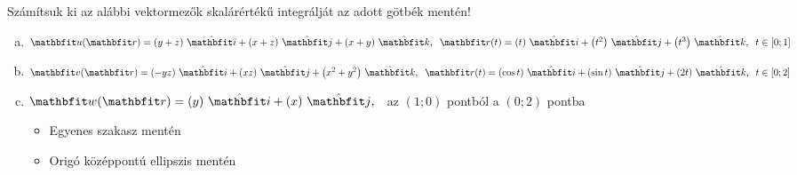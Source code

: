 \documentclass[exercise]{math-standalone}
\begin{document}
\begin{exercise}{Számítsuk ki az alábbi vektormezők skalárértékű integrálját az adott götbék mentén!}
  \begin{enumerate}[a)]
    \item $\rvec u(\rvec r) = \ijk{y + z}{x + z}{x + y}, \;\; \rvec r(t) = \ijk{t}{t^2}{t^3}, \;\; t \in [0; 1]$
    \item $\rvec v(\rvec r) = \ijk{-yz}{xz}{x^2 + y^2}, \;\; \rvec r(t) = \ijk{\cos t}{\sin t}{2t}, \;\; t \in [0; 2]$
    \item $\rvec w(\rvec r) = \ijz{y}{x}, \;\;$ az $(1;0)$ pontból a $(0;2)$ pontba
          \begin{multicols}{2}
            \begin{itemize}
              \item Egyenes szakasz mentén
              \item Origó középpontú ellipszis mentén
            \end{itemize}
          \end{multicols}
  \end{enumerate}

\end{exercise}
\end{document}
